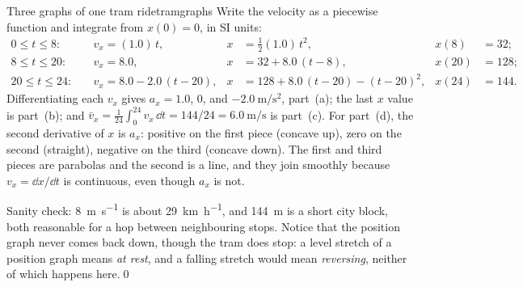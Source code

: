 \begin{example}{Three graphs of one tram ride}{tramgraphs}
\calc Write the velocity as a piecewise function and integrate from $x(0) = 0$, in SI units:
\begin{align*}
0 \le t \le 8:&\quad v_x = (1.0)\,t, & x &= \tfrac12(1.0)\,t^2, & x(8) &= 32; \\
8 \le t \le 20:&\quad v_x = 8.0, & x &= 32 + 8.0\,(t - 8), & x(20) &= 128; \\
20 \le t \le 24:&\quad v_x = 8.0 - 2.0\,(t - 20), & x &= 128 + 8.0\,(t - 20) - (t - 20)^2, & x(24) &= 144.
\end{align*}
Differentiating each $v_x$ gives $a_x = 1.0$, $0$, and $-2.0\ \si{\metre\per\second\squared}$, part~(a); the last $x$ value is part~(b); and $\bar v_x = \frac{1}{24}\int_0^{24} v_x\,\dd t = 144/24 = \SI{6.0}{\metre\per\second}$ is part~(c). For part~(d), the second derivative of $x$ is $a_x$: positive on the first piece (concave up), zero on the second (straight), negative on the third (concave down). The first and third pieces are parabolas and the second is a line, and they join smoothly because $v_x = \dd x/\dd t$ is continuous, even though $a_x$ is not.

Sanity check: \SI{8}{\metre\per\second} is about \SI{29}{\kilo\metre\per\hour}, and \SI{144}{\metre} is a short city block, both reasonable for a hop between neighbouring stops. Notice that the position graph never comes back down, though the tram does stop: a level stretch of a position graph means \emph{at rest}, and a falling stretch would mean \emph{reversing}, neither of which happens here.\qed
\end{example}

